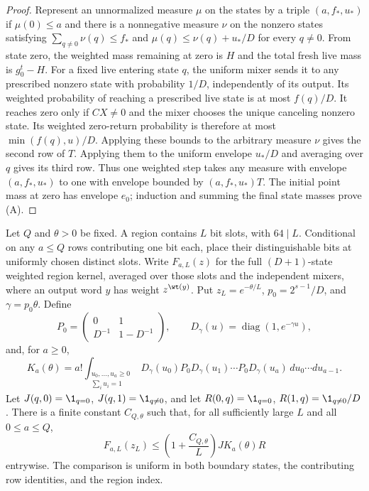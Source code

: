 \begin{proof}
Represent an unnormalized measure $\mu$ on the states by a triple
$(a,f_*,u_*)$ if $\mu(0)\le a$ and there is a nonnegative measure
$\nu$ on the nonzero states satisfying
$\sum_{q\ne0}\nu(q)\le f_*$ and
$\mu(q)\le\nu(q)+u_*/D$ for every $q\ne0$.
From state zero, the weighted mass remaining at zero is $H$ and the
total fresh live mass is $g_0^t-H$. For a fixed live entering state
$q$, the uniform mixer sends it to any prescribed nonzero state with
probability $1/D$, independently of its output. Its weighted
probability of reaching a prescribed live state is at most $f(q)/D$.
It reaches zero only if $CX\ne0$ and the mixer chooses the unique
canceling nonzero state. Its weighted zero-return probability is
therefore at most $\min(f(q),u)/D$. Applying these bounds to the
arbitrary measure $\nu$ gives the second row of $T$. Applying them
to the uniform envelope $u_*/D$ and averaging over $q$ gives its
third row. Thus one weighted step takes any measure with envelope
$(a,f_*,u_*)$ to one with envelope bounded by
$(a,f_*,u_*)T$. The initial point mass at zero has envelope $e_0$;
induction and summing the final state masses prove (A).
\end{proof}

\begin{lemma}
\label{lem:shared-inner-fixed-region}
Let $Q$ and $\theta>0$ be fixed. A region contains $L$ bit slots, with
$64\mid L$. Conditional on any $a\le Q$ rows contributing one bit each,
place their distinguishable bits at uniformly chosen distinct slots.
Write $F_{a,L}(z)$ for the full $(D+1)$-state weighted region kernel,
averaged over those slots and the independent mixers, where an output
word $y$ has weight $z^{\wt(y)}$. Put $z_L=e^{-\theta/L}$,
$p_0=2^{s-1}/D$, and $\gamma=p_0\theta$. Define
\[
 P_0=\begin{pmatrix}0&1\\D^{-1}&1-D^{-1}\end{pmatrix},\qquad
 D_\gamma(u)=\operatorname{diag}(1,e^{-\gamma u}),
\]
and, for $a\ge0$,
\[
 K_a(\theta)=a!\int_{\substack{u_0,\ldots,u_a\ge0\\
                                  \sum_i u_i=1}}
 D_\gamma(u_0)P_0D_\gamma(u_1)\cdots P_0D_\gamma(u_a)
 \,du_0\cdots du_{a-1}.
\]
Let $J(q,0)=\1_{q=0}$, $J(q,1)=\1_{q\ne0}$, and let
$R(0,q)=\1_{q=0}$, $R(1,q)=\1_{q\ne0}/D$. There is a finite constant
$C_{Q,\theta}$ such that, for all sufficiently large $L$ and all
$0\le a\le Q$,
\[
 F_{a,L}(z_L)\le
 \left(1+\frac{C_{Q,\theta}}L\right)J K_a(\theta)R
 \tag{1}
\]
entrywise. The comparison is uniform in both boundary states, the
contributing row identities, and the region index.
\end{lemma}

